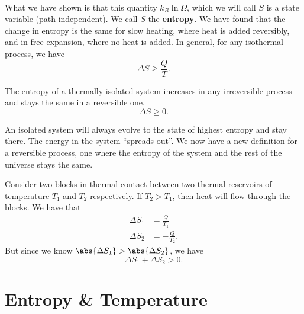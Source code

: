 \documentclass[../thermodynamics.tex]{subfiles}
\begin{document}
        \paragraph{}
        What we have shown is that this quantity $k_B\ln\Omega$, which we will call $S$ is a state variable (path independent).
        We call $S$ the \textbf{entropy}.
        We have found that the change in entropy is the same for slow heating, where heat is added reversibly, and in free expansion, where no heat is added.
        In general, for any isothermal process, we have
        \begin{equation}
            \Delta S\geq\frac{Q}{T}.
        \end{equation}
        \begin{definition}
            The entropy of a thermally isolated system increases in any irreversible process and stays the same in a reversible one.
            \begin{equation}
                \Delta S\geq 0.
            \end{equation}      
        \end{definition}
        An isolated system will always evolve to the state of highest entropy and stay there.
        The energy in the system ``spreads out''.
        We now have a new definition for a reversible process, one where the entropy of the system and the rest of the universe stays the same.
        \begin{example}
            Consider two blocks in thermal contact between two thermal reservoirs of temperature $T_1$ and $T_2$ respectively.
            If $T_2>T_1$, then heat will flow through the blocks.
            We have that
            \begin{align}
                \Delta S_1&=\frac{Q}{T_1}\\
                \Delta S_2&=-\frac{Q}{T_2}.
            \end{align}
            But since we know $\abs{\Delta S_1}>\abs{\Delta S_2}$, we have
            \begin{equation}
                \Delta S_1+\Delta S_2>0.
            \end{equation}
        \end{example}

    \section{Entropy \& Temperature}
\end{document}
